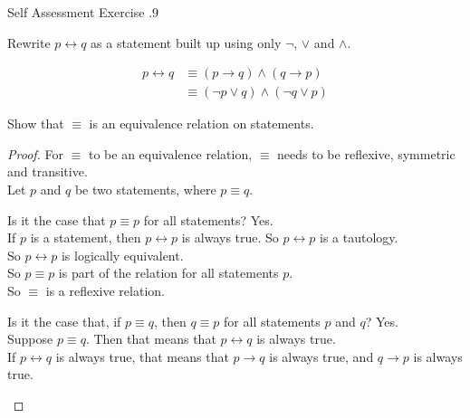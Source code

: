 \documentclass[\main/notes.tex]{subfiles}
\begin{document}
			\pagebreak
			\begin{exercise}{Self Assessment Exercise \thechapter.9}
				\begin{questions}
					\item Rewrite $p \leftrightarrow q$ as a statement built up using only $\lnot$, $\lor$ and $\land$.
						\begin{answer}
							\begin{align*}
								p \leftrightarrow q &\equiv (p \rightarrow q) \land (q \rightarrow p)\\
								&\equiv (\lnot p \lor q) \land (\lnot q \lor p)
							\end{align*}
						\end{answer}
					\item Show that $\equiv$ is an equivalence relation on statements.
						\begin{answer}
							\begin{proof}
								For $\equiv$ to be an equivalence relation, $\equiv$ needs to be reflexive, symmetric and transitive.\\
								Let $p$ and $q$ be two statements, where $p \equiv q$.
								\begin{questions}[label=(\roman*)]
									\item
										\begin{subproof}[Reflexivity]
											Is it the case that $p \equiv p$ for all statements? Yes.\\
											If $p$ is a statement, then $p \leftrightarrow p$ is always true. So $p \leftrightarrow p$ is a tautology.\\
											So $p \leftrightarrow p$ is logically equivalent.\\
											So $p \equiv p$ is part of the relation for all statements $p$.\\
											So $\equiv$ is a reflexive relation.
										\end{subproof}
									\item
										\begin{subproof}[Symmetry]
											Is it the case that, if $p \equiv q$, then $q \equiv p$ for all statements $p$ and $q$? Yes.\\
											Suppose $p \equiv q$. Then that means that $p \leftrightarrow q$ is always true.\\
											If $p \leftrightarrow q$ is always true, that means that $p \rightarrow q$ is always true, and $q \rightarrow p$ is always true.\\

\end{subproof}
\end{questions}
\end{proof}
\end{answer}
\end{questions}
\end{exercise}
\end{document}
